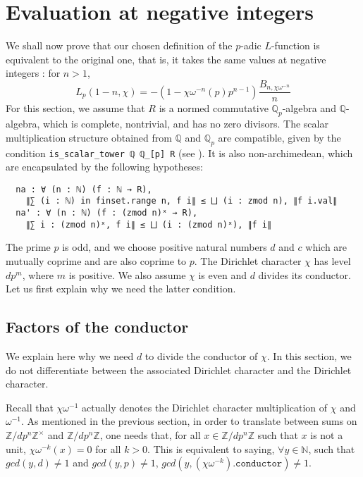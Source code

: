 \documentclass[a4paper,UKenglish,cleveref, autoref, thm-restate]{lipics-v2021}
\newcommand{\lean}[1]{\texttt{#1}\xspace} %
\begin{document}
\section{Evaluation at negative integers}
\label{section4}
We shall now prove that our chosen definition of the $p$-adic $L$-function is equivalent to the original one, that is, 
it takes the same values at negative integers : for $n > 1$,
$$ L_p (1 - n, \chi) = -(1 - \chi \omega^{-n}(p)p^{n - 1}) \frac{B_{n, \chi \omega^{-n}}}{n} $$
For this section, we assume that $R$ is a normed commutative $\mathbb{Q}_p$-algebra and $\mathbb{Q}$-algebra, 
which is complete, nontrivial, and has no zero divisors. The scalar multiplication structure obtained from $\mathbb{Q}$ 
and $\mathbb{Q}_p$ are compatible, given by the condition \lean{is\_scalar\_tower ℚ ℚ\_[p] R} (see \cite{DD}). It is also non-archimedean, which are encapsulated by the following hypotheses:
\begin{lstlisting}
  na : ∀ (n : ℕ) (f : ℕ → R), 
    ∥∑ (i : ℕ) in finset.range n, f i∥ ≤ ⨆ (i : zmod n), ∥f i.val∥
  na' : ∀ (n : ℕ) (f : (zmod n)ˣ → R), 
    ∥∑ i : (zmod n)ˣ, f i∥ ≤ ⨆ (i : (zmod n)ˣ), ∥f i∥
\end{lstlisting}
The prime $p$ is odd, and we choose positive natural numbers $d$ and $c$ which are mutually coprime and are also coprime to 
$p$. The Dirichlet character $\chi$ has level $d p^m$, where $m$ is positive. We also assume $\chi$ is even and $d$ divides 
its conductor. Let us first explain why we need the latter condition.

\subsection{Factors of the conductor}
We explain here why we need $d$ to divide the conductor of $\chi$. In this section, we do not differentiate between the associated Dirichlet 
character and the Dirichlet character. 

Recall that $\chi \omega^{-1}$ actually denotes the Dirichlet 
character multiplication of $\chi$ and $\omega^{-1}$. As mentioned in the previous section, in order to translate between sums on 
$\mathbb{Z}/ d p^n \mathbb{Z} ^{\times}$ and $\mathbb{Z}/ d p^n \mathbb{Z}$, one needs that, for all $x \in \mathbb{Z}/ d p^n \mathbb{Z}$ 
such that $x$ is not a unit, $\chi \omega^{-k} (x) = 0$ for all $k > 0$. This is equivalent to saying, $\forall y \in \mathbb{N}$, such that 
$gcd (y, d) \ne 1$ and $gcd (y, p) \ne 1$, $gcd (y, (\chi \omega^{-k})\texttt{.conductor}) \ne 1$. 
\end{document}
